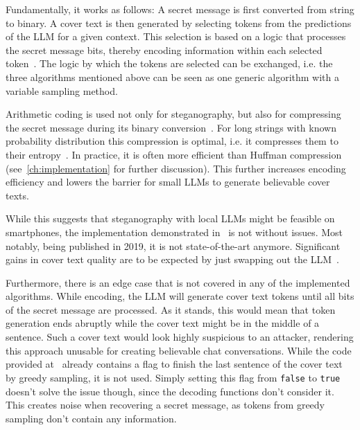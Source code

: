 Fundamentally, it works as follows: A secret message is first converted from string to binary. A cover text is then generated by selecting tokens from the predictions of the \gls{LLM} for a given context. This selection is based on a logic that processes the secret message bits, thereby encoding information within each selected token~\cite{zieglerNeuralLinguisticSteganography2019}. The logic by which the tokens are selected can be exchanged, i.e. the three algorithms mentioned above can be seen as one generic algorithm with a variable sampling method.

Arithmetic coding is used not only for steganography, but also for compressing the secret message during its binary conversion~\cite{zieglerNeuralLinguisticSteganography2019}. For long strings with known probability distribution this compression is optimal, i.e. it compresses them to their entropy~\cite{rissanenArithmeticCoding1979}. In practice, it is often more efficient than Huffman compression~\cite{zieglerNeuralLinguisticSteganography2019} (see~\cref{ch:implementation} for further discussion). This further increases encoding efficiency and lowers the barrier for small \glspl{LLM} to generate believable cover texts.

While this suggests that steganography with local \glspl{LLM} might be feasible on smartphones, the implementation demonstrated in~\cite{zieglerStegasuras2025} is not without issues. Most notably, being published in 2019, it is not state-of-the-art anymore. Significant gains in cover text quality are to be expected by just swapping out the \gls{LLM}~\cite{wuGenerativeTextSteganography2024}.

Furthermore, there is an edge case that is not covered in any of the implemented algorithms. While encoding, the \gls{LLM} will generate cover text tokens until all bits of the secret message are processed. As it stands, this would mean that token generation ends abruptly while the cover text might be in the middle of a sentence. Such a cover text would look highly suspicious to an attacker, rendering this approach unusable for creating believable chat conversations. While the code provided at~\cite{zieglerHarvardnlpNeuralSteganography2025} already contains a flag to finish the last sentence of the cover text by greedy sampling, it is not used. Simply setting this flag from \lstinline|false| to \lstinline|true| doesn't solve the issue though, since the decoding functions don't consider it. This creates noise when recovering a secret message, as tokens from greedy sampling don't contain any information.


